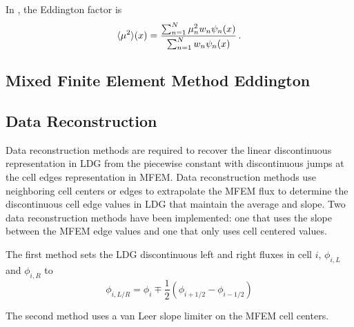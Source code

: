 In \SN, the Eddington factor is 
	\begin{equation} \label{eq:edd_sn}
		\langle \mu^2 \rangle(x) = \frac{\sum_{n=1}^N \mu_n^2 w_n\psi_n(x)}{\sum_{n=1}^N w_n \psi_n(x)} \,.
	\end{equation}

\subsection{Mixed Finite Element Method Eddington}


\subsection{Data Reconstruction}
	Data reconstruction methods are required to recover the linear discontinuous representation in LDG from the piecewise constant with discontinuous jumps at the cell edges representation in MFEM. Data reconstruction methods use neighboring cell centers or edges to extrapolate the MFEM flux to determine the discontinuous cell edge values in LDG that maintain the average and slope. Two data reconstruction methods have been implemented: one that uses the slope between the MFEM edge values and one that only uses cell centered values. 

	The first method sets the LDG discontinuous left and right fluxes in cell $i$, $\phi_{i,L}$ and $\phi_{i,R}$ to 
		\begin{equation}
			\phi_{i,L/R} = \phi_i \mp \frac{1}{2} \left(\phi_{i+1/2} - \phi_{i-1/2}\right)
		\end{equation}

	The second method uses a van Leer slope limiter on the MFEM cell centers. 